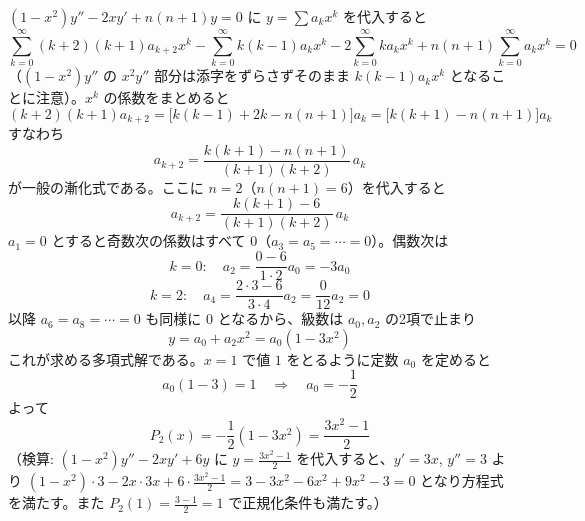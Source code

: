 
$(1-x^2)y'' - 2xy' + n(n+1)y = 0$ に $y=\sum a_k x^k$ を代入すると
\[
\sum_{k=0}^{\infty}(k+2)(k+1)a_{k+2}x^{k}
-\sum_{k=0}^{\infty} k(k-1)a_k x^{k}
-2\sum_{k=0}^{\infty} k a_k x^k
+ n(n+1)\sum_{k=0}^{\infty} a_k x^k = 0
\]
（$(1-x^2)y''$ の $x^2 y''$ 部分は添字をずらさずそのまま $k(k-1)a_k x^k$ となることに注意）。$x^k$ の係数をまとめると
\[
(k+2)(k+1)a_{k+2} = \big[k(k-1) + 2k - n(n+1)\big]a_k = \big[k(k+1) - n(n+1)\big]a_k
\]
すなわち
\[
a_{k+2} = \frac{k(k+1) - n(n+1)}{(k+1)(k+2)}\,a_k
\]
が一般の漸化式である。ここに $n=2$（$n(n+1)=6$）を代入すると
\[
a_{k+2} = \frac{k(k+1)-6}{(k+1)(k+2)}\,a_k
\]
$a_1=0$ とすると奇数次の係数はすべて $0$（$a_3=a_5=\cdots=0$）。偶数次は
\[
k=0:\quad a_2 = \frac{0-6}{1\cdot 2}a_0 = -3a_0
\]
\[
k=2:\quad a_4 = \frac{2\cdot 3 - 6}{3\cdot 4}a_2 = \frac{0}{12}a_2 = 0
\]
以降 $a_6=a_8=\cdots=0$ も同様に $0$ となるから、級数は $a_0, a_2$ の2項で止まり
\[
y = a_0 + a_2 x^{2} = a_0\left(1 - 3x^{2}\right)
\]
これが求める多項式解である。$x=1$ で値 $1$ をとるように定数 $a_0$ を定めると
\[
a_0(1-3) = 1 \quad\Longrightarrow\quad a_0 = -\frac{1}{2}
\]
よって
\[
\boxed{\; P_2(x) = -\frac{1}{2}\left(1-3x^{2}\right) = \frac{3x^{2}-1}{2} \;}
\]
（検算: $(1-x^2)y''-2xy'+6y$ に $y=\frac{3x^2-1}{2}$ を代入すると、$y'=3x$, $y''=3$ より
$(1-x^2)\cdot 3 - 2x\cdot 3x + 6\cdot\frac{3x^2-1}{2} = 3-3x^2-6x^2+9x^2-3 = 0$ となり方程式を満たす。また $P_2(1)=\frac{3-1}{2}=1$ で正規化条件も満たす。）
